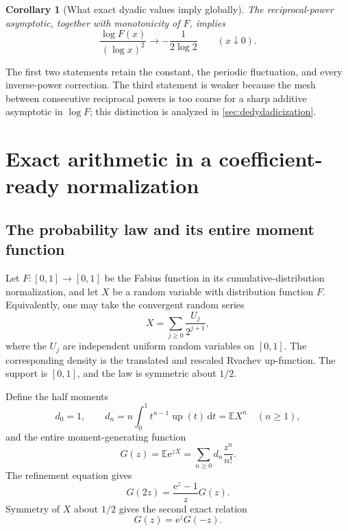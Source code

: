 \documentclass[11pt,oneside]{article}
\newtheorem{corollary}[theorem]{Corollary}
\theoremstyle{definition}
\theoremstyle{remark}
\newcommand{\Up}{\operatorname{up}}
\newcommand{\e}{\mathrm e}
\newcommand{\dd}{\,\mathrm d}
\newcommand{\E}{\mathbb E}
\begin{document}
\begin{corollary}[What exact dyadic values imply globally]
\label{cor:global-leading}
The reciprocal-power asymptotic, together with monotonicity of $F$, implies
\begin{equation}
 \frac{\log F(x)}{(\log x)^2}\longrightarrow-\frac1{2\log2}
 \qquad(x\downarrow0).
\label{eq:global-quadratic-law}
\end{equation}
\end{corollary}

The first two statements retain the constant, the periodic fluctuation, and every inverse-power correction.  The third statement is weaker because the mesh between consecutive reciprocal powers is too coarse for a sharp additive asymptotic in $\log F$; this distinction is analyzed in \cref{sec:dedydadicization}.

\section{Exact arithmetic in a coefficient-ready normalization}
\label{sec:exact-layer}

\subsection{The probability law and its entire moment function}

Let $F:[0,1]\to[0,1]$ be the Fabius function in its cumulative-distribution normalization, and let $X$ be a random variable with distribution function $F$.  Equivalently, one may take the convergent random series
\begin{equation}
 X=\sum_{j\ge0}\frac{U_j}{2^{j+1}},
\label{eq:random-series}
\end{equation}
where the $U_j$ are independent uniform random variables on $[0,1]$.  The corresponding density is the translated and rescaled Rvachev up-function.  The support is $[0,1]$, and the law is symmetric about $1/2$.

Define the half moments
\begin{equation}
 d_0=1,
 \qquad
 d_n=n\int_0^1t^{n-1}\Up(t)\dd t=\E X^n
 \quad(n\ge1),
\label{eq:d-moments}
\end{equation}
and the entire moment-generating function
\begin{equation}
 G(z)=\E\e^{zX}=\sum_{n\ge0}d_n\frac{z^n}{n!}.
\label{eq:G-def}
\end{equation}
The refinement equation gives
\begin{equation}
 G(2z)=\frac{\e^z-1}{z}G(z).
\label{eq:G-functional}
\end{equation}
Symmetry of $X$ about $1/2$ gives the second exact relation
\begin{equation}
 G(z)=\e^zG(-z).
\label{eq:G-symmetry}
\end{equation}
\end{document}
